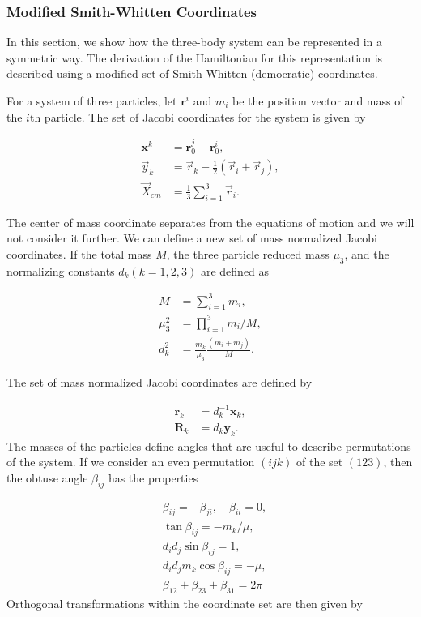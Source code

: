 \documentclass{article}
\begin{document}
\subsubsection{Modified Smith-Whitten Coordinates}
In this section, we show how the three-body system can be represented in a symmetric way. The derivation of the Hamiltonian for this representation is described using a modified set of Smith-Whitten (democratic) coordinates. 

For a system of three particles, let $\mathbf{r}^i$ and $m_i$ be the position vector and mass of the $i$th particle. The set of Jacobi coordinates for the system is given by

\begin{subequations}
	\begin{align}
	\mathbf{x}^k 		&= \mathbf{r}^{j}_0 - \mathbf{r}^{i}_0,\\
	\vec{y}_k 		&= \vec{r}_k - \frac{1}{2}(\vec{r}_i + \vec{r}_j),\\
	\vec{X}_{cm} 	&= \frac{1}{3} \sum_{i=1}^{3}\vec{r}_i.
	\end{align}
\end{subequations}

The center of mass coordinate separates from the equations of motion and we will not consider it further. We can define a new set of mass normalized Jacobi coordinates. If the total mass $M$, the three particle reduced mass $\mu_3$, and the normalizing constants $d_k (k=1,2,3)$ are defined as 

\begin{align}
M &= \sum_{i=1}^{3}m_i,\\
\mu_3^2 &= \prod_{i=1}^{3}m_i/M,\\
d_k^2 &= \frac{m_k}{\mu_3}\frac{(m_i+m_j)}{M}. 
\end{align}

The set of mass normalized Jacobi coordinates are defined by

\begin{align}
\mathbf{r}_k &= d^{-1}_k\mathbf{x}_k,\\
\mathbf{R}_k &= d_k\mathbf{y}_k.  
\end{align}
The masses of the particles define angles that are useful to describe permutations of the system. If we consider an even permutation $(ijk)$ of the set $(123)$, then the obtuse angle $\beta_{ij}$ has the properties

\begin{subequations}
	\begin{align}
		&\beta_{ij} = -\beta_{ji}, \quad \beta_{ii} = 0,\\
		&\tan\beta_{ij} = -m_k/\mu,\\
		&d_{i}d_{j} \sin\beta_{ij} = 1,\\
		&d_{i}d_{j} m_{k} \cos\beta_{ij} = -\mu,\\
		&\beta_{12}+\beta_{23}+\beta_{31} = 2\pi
	\end{align}
\end{subequations}
Orthogonal transformations within the coordinate set are then given by 
\end{document}
